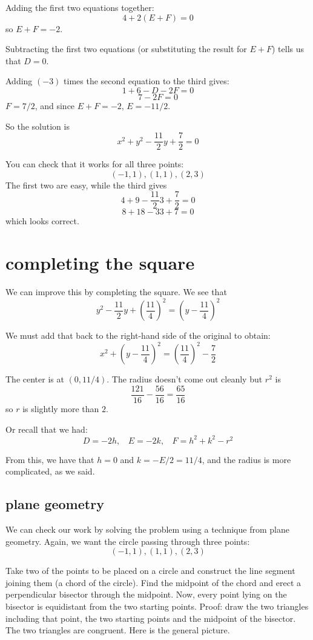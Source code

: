 \documentclass[11pt, oneside]{article}
\begin{document}
Adding the first two equations together:
\[ 4 + 2(E + F) = 0 \]
so $E + F = -2$.

Subtracting the first two equations (or substituting the result for $E + F$) tells us that $D = 0$.

Adding $(-3)$ times the second equation to the third gives:
\[ 1 + 6 - D - 2F = 0 \]
\[ 7 - 2F = 0 \]
$F = 7/2$, and since $E + F = -2$, $E = -11/2$.

So the solution is
\[ x^2 + y^2 - \frac{11}{2} y + \frac{7}{2} = 0 \]

You can check that it works for all three points:
\[ (-1,1), (1,1), (2,3) \]
The first two are easy, while the third gives
\[ 4 + 9 - \frac{11}{2} 3 + \frac{7}{2} = 0 \]
\[ 8 + 18 - 33 + 7 = 0 \]
which looks correct.

\section*{completing the square}

We can improve this by completing the square.  We see that
\[ y^2 - \frac{11}{2} y + ( \frac{11}{4})^2 = (y - \frac{11}{4})^2 \]

We must add that back to the right-hand side of the original to obtain:
\[ x^2 +  (y - \frac{11}{4})^2 =  ( \frac{11}{4})^2 - \frac{7}{2} \]

The center is at $(0,11/4)$.  The radius doesn't come out cleanly but $r^2$ is
\[ \frac{121}{16} - \frac{56}{16} = \frac{65}{16} \]
so $r$ is slightly more than $2$.

Or recall that we had:
\[ D = - 2h, \ \ \ \ E = - 2k, \ \ \ \ F = h^2 + k^2 - r^2 \]

From this, we have that $h = 0$ and $k = -E/2 = 11/4$, and the radius is more complicated, as we said.

\subsection*{plane geometry}

We can check our work by solving the problem using a technique from plane geometry.  Again, we want the circle passing through three points:
\[ (-1,1), (1,1), (2,3) \]

Take two of the points to be placed on a circle and construct the line segment joining them (a chord of the circle).  Find the midpoint of the chord and erect a perpendicular bisector through the midpoint.  Now, every point lying on the bisector is equidistant from the two starting points.  Proof:  draw the two triangles including that point, the two starting points and the midpoint of the bisector.  The two triangles are congruent.  Here is the general picture.
\end{document}
